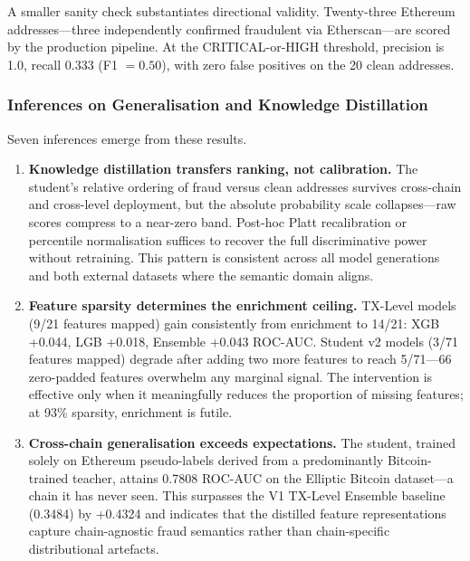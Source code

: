 \documentclass[journal]{IEEEtran}
\begin{document}
A smaller sanity check substantiates directional validity. Twenty-three Ethereum addresses---three independently confirmed fraudulent via Etherscan---are scored by the production pipeline. At the CRITICAL-or-HIGH threshold, precision is 1.0, recall 0.333 (F1 $= 0.50$), with zero false positives on the 20 clean addresses.

\subsubsection{Inferences on Generalisation and Knowledge Distillation}

Seven inferences emerge from these results.

\begin{enumerate}
  \item \textbf{Knowledge distillation transfers ranking, not calibration.} The student's relative ordering of fraud versus clean addresses survives cross-chain and cross-level deployment, but the absolute probability scale collapses---raw scores compress to a near-zero band. Post-hoc Platt recalibration or percentile normalisation suffices to recover the full discriminative power without retraining. This pattern is consistent across all model generations and both external datasets where the semantic domain aligns.

  \item \textbf{Feature sparsity determines the enrichment ceiling.} TX-Level models (9/21 features mapped) gain consistently from enrichment to 14/21: XGB +0.044, LGB +0.018, Ensemble +0.043 ROC-AUC. Student v2 models (3/71 features mapped) degrade after adding two more features to reach 5/71---66 zero-padded features overwhelm any marginal signal. The intervention is effective only when it meaningfully reduces the proportion of missing features; at 93\% sparsity, enrichment is futile.

  \item \textbf{Cross-chain generalisation exceeds expectations.} The student, trained solely on Ethereum pseudo-labels derived from a predominantly Bitcoin-trained teacher, attains 0.7808 ROC-AUC on the Elliptic Bitcoin dataset---a chain it has never seen. This surpasses the V1 TX-Level Ensemble baseline (0.3484) by +0.4324 and indicates that the distilled feature representations capture chain-agnostic fraud semantics rather than chain-specific distributional artefacts.


\end{enumerate}
\end{document}
